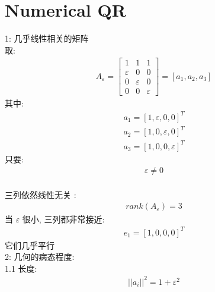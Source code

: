 \documentclass[12pt]{article}
\begin{document}
\section{Numerical QR}
\begin{flushleft}
    1: 几乎线性相关的矩阵 \\
    取: \\
    \begin{align}
        A_{\varepsilon} = \begin{bmatrix}
                              1           & 1           & 1           \\
                              \varepsilon & 0           & 0           \\
                              0           & \varepsilon & 0           \\
                              0           & 0           & \varepsilon
                          \end{bmatrix} = [a_{1}, a_{2}, a_{3}]
    \end{align}
    其中: \\
    \begin{align}
        a_{1} = [1, \varepsilon, 0, 0]^{T} \\
        a_{2} = [1, 0, \varepsilon, 0]^{T} \\
        a_{3} = [1, 0, 0, \varepsilon]^{T}
    \end{align}
    只要: \\
    \begin{align}
        \varepsilon \neq 0
    \end{align} \\
    三列依然线性无关 : \\
    \begin{align}
        rank(A_{\varepsilon}) = 3
    \end{align}
    当 $\varepsilon$ 很小, 三列都非常接近: \\
    \begin{align}
        e_{1} = [1, 0 ,0 ,0]^{T}
    \end{align}
    它们几乎平行 \\

    2: 几何的病态程度: \\

    1.1 长度: \\
    \begin{align}
        ||a_{i}||^{2} = 1 + \varepsilon^{2}
    \end{align}


\end{flushleft}
\end{document}
